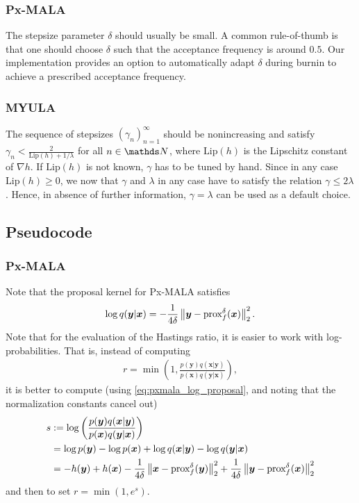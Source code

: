 \documentclass[10pt]{article}
\numberwithin{equation}{section}
\begin{document}
\subsubsection*{Px-MALA}

The stepsize parameter $\delta$ should usually be small. A common rule-of-thumb is that one should choose $\delta$ such that the acceptance frequency is around $0.5$. Our implementation provides an option to automatically adapt $\delta$ during burnin to achieve a prescribed acceptance frequency.

\subsubsection*{MYULA}

The sequence of stepsizes $(\gamma_n)_{n=1}^\infty$ should be nonincreasing and satisfy $\gamma_n < \frac{2}{\mathrm{Lip}(h) + 1/\lambda}$ for all $n \in \N$, where $\mathrm{Lip}(h)$ is the Lipschitz constant of $\nabla h$. If $\mathrm{Lip}(h)$ is not known, $\gamma$ has to be tuned by hand. Since in any case $\mathrm{Lip}(h) \geq 0$, we now that $\gamma$ and $\lambda$ in any case have to satisfy the relation $\gamma \leq 2 \lambda$. Hence, in absence of further information, $\gamma = \lambda$ can be used as a default choice.

\subsection{Pseudocode}

\subsubsection*{Px-MALA}

Note that the proposal kernel for Px-MALA satisfies
\begin{align}
\log q(\bm y | \bm x) = - \frac{1}{4\delta}\left\|\bm y - \text{prox}_{f}^{\delta}(\bm x)\right\|_2^2. \label{eq:pxmala_log_proposal}
\end{align}
Note that for the evaluation of the Hastings ratio, it is easier to work with log-probabilities. That is, instead of computing
\begin{align*}
r = \min \left( 1, \frac{p(\bm y) q(\bm x | \bm y)}{p(\bm x) q(\bm y | \bm x)} \right),
\end{align*}
it is better to compute (using \eqref{eq:pxmala_log_proposal}, and noting that the normalization constants cancel out)
\begin{align*}
s & := \log \left(\frac{p(\bm y) q(\bm x | \bm y)}{p(\bm x) q(\bm y | \bm x)} \right) \\
& = \log p(\bm y) - \log p(\bm x) + \log q(\bm x | \bm y) - \log q(\bm y | \bm x) \\
& = - h(\bm y) + h(\bm x) - \frac{1}{4 \delta}\left\|\bm x - \text{prox}_{f}^{\delta}(\bm y)\right\|_2^2 + \frac{1}{4 \delta}\left\|\bm y - \text{prox}_{f}^{\delta}(\bm x)\right\|_2^2
\end{align*}
and then to set $r = \min(1, e^s)$.
\end{document}
